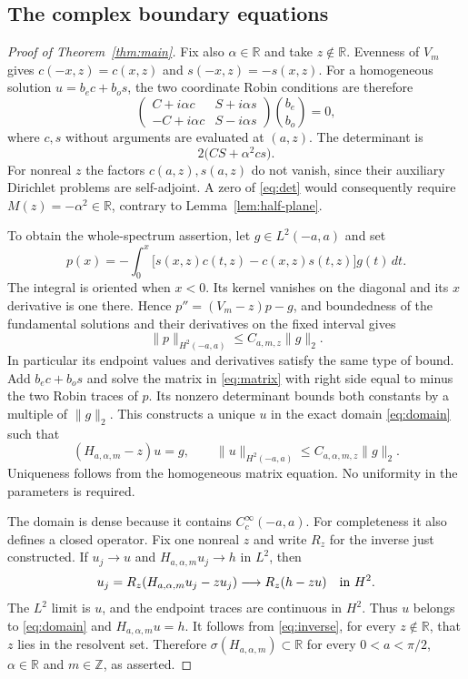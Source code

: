 \documentclass[11pt]{article}
\newcommand{\R}{\mathbb R}
\newcommand{\norm}[1]{\lVert#1\rVert}
\begin{document}
\subsection{The complex boundary equations}

\begin{proof}[Proof of Theorem~\ref{thm:main}]
Fix also $\alpha\in\R$ and take $z\notin\R$.
Evenness of $V_m$ gives $c(-x,z)=c(x,z)$ and $s(-x,z)=-s(x,z)$.
For a homogeneous solution $u=b_ec+b_os$, the two coordinate Robin
conditions are therefore
\begin{equation}\label{eq:matrix}
 \begin{pmatrix}
 C+i\alpha c&S+i\alpha s\\
 -C+i\alpha c&S-i\alpha s
 \end{pmatrix}
 \binom{b_e}{b_o}=0,
\end{equation}
where $c,s$ without arguments are evaluated at $(a,z)$.
The determinant is
\begin{equation}\label{eq:det}
 2\bigl(CS+\alpha^2cs\bigr).
\end{equation}
For nonreal $z$ the factors $c(a,z),s(a,z)$ do not vanish, since their
auxiliary Dirichlet problems are self-adjoint. A zero of
\eqref{eq:det} would consequently require $M(z)=-\alpha^2\in\R$,
contrary to Lemma~\ref{lem:half-plane}.

To obtain the whole-spectrum assertion, let $g\in L^2(-a,a)$ and set
\[
 p(x)=-\int_0^x\bigl[s(x,z)c(t,z)-c(x,z)s(t,z)\bigr]g(t)\,dt.
\]
The integral is oriented when $x<0$. Its kernel vanishes on the diagonal
and its $x$ derivative is one there. Hence
$p''=(V_m-z)p-g$, and boundedness of the fundamental solutions and
their derivatives on the fixed interval gives
\[
 \norm{p}_{H^2(-a,a)}\leq C_{a,m,z}\norm{g}_2.
\]
In particular its endpoint values and derivatives satisfy the same type
of bound. Add $b_ec+b_os$ and solve the matrix in \eqref{eq:matrix}
with right side equal to minus the two Robin traces of $p$.
Its nonzero determinant bounds both constants by a multiple of
$\norm{g}_2$. This constructs a unique $u$ in the exact domain
\eqref{eq:domain} such that
\begin{equation}\label{eq:inverse}
 (H_{a,\alpha,m}-z)u=g,\qquad
 \norm{u}_{H^2(-a,a)}\leq C_{a,\alpha,m,z}\norm{g}_2.
\end{equation}
Uniqueness follows from the homogeneous matrix equation. No uniformity
in the parameters is required.

The domain is dense because it contains $C_c^\infty(-a,a)$.
For completeness it also defines a closed operator. Fix one nonreal
$z$ and write $R_z$ for the inverse just constructed. If $u_j\to u$
and $H_{a,\alpha,m}u_j\to h$ in $L^2$, then
\[
 u_j=R_z(H_{a,\alpha,m}u_j-zu_j)
       \longrightarrow R_z(h-zu)\quad\hbox{in }H^2.
\]
The $L^2$ limit is $u$, and the endpoint traces are continuous in $H^2$.
Thus $u$ belongs to \eqref{eq:domain} and $H_{a,\alpha,m}u=h$.
It follows from \eqref{eq:inverse}, for every $z\notin\R$, that
$z$ lies in the resolvent set. Therefore
$\sigma(H_{a,\alpha,m})\subset\R$ for every $0<a<\pi/2$,
$\alpha\in\R$ and $m\in\mathbb Z$, as asserted.
\end{proof}
\end{document}
